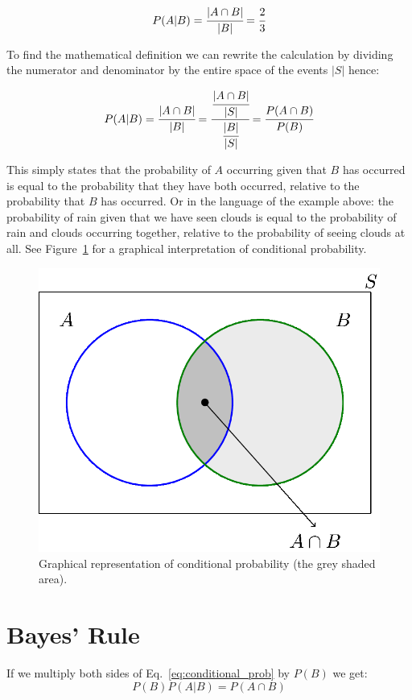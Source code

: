 \begin{equation}
P(A|B) = \cfrac{|A\cap B|}{|B|} = \cfrac{2}{3}
\end{equation}

To find the mathematical definition we can rewrite the calculation by dividing the numerator and denominator by the entire space of the events $|S|$ hence:

\begin{equation}
  P(A|B) = \cfrac{|A\cap B|}{|B|} = \cfrac{\cfrac{|A\cap B|}{|S|}}{\cfrac{|B|}{|S|}} = \cfrac{P(A\cap B)}{P(B)}
  \label{eq:conditional_prob}
\end{equation}

This simply states that the probability of $A$ occurring given that $B$ has occurred is equal to the probability that they have both occurred, relative to the probability that $B$ has occurred.
Or in the language of the example above: the probability of rain given that we have seen clouds is equal to the probability of rain and clouds occurring together, relative to the probability of seeing clouds at all.
See Figure~\ref{fig:conditional_prob} for a graphical interpretation of conditional probability.

\begin{figure}[tb]
  \centering
  \includegraphics[width=0.5\linewidth]{figures/conditional_b}
  \caption{Graphical representation of conditional probability (the grey shaded area).}
  \label{fig:conditional_prob}
\end{figure}

\section{Bayes' Rule}

If we multiply both sides of Eq.~\ref{eq:conditional_prob} by $P(B)$ we get:
\begin{equation}
P(B)P(A|B)=P(A\cap B)
\end{equation}

